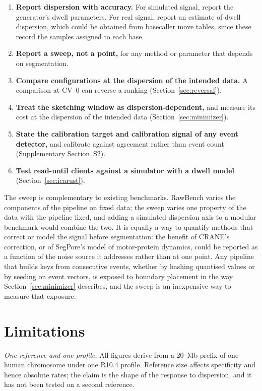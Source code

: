 \documentclass[11pt,a4paper]{article}
\begin{document}
\begin{enumerate}
  \item \textbf{Report dispersion with accuracy.} For simulated signal, report the generator's
    dwell parameters. For real signal, report an estimate of dwell dispersion, which could be
    obtained from basecaller move tables, since these record the samples assigned to each base.
  \item \textbf{Report a sweep, not a point,} for any method or parameter that depends on
    segmentation.
  \item \textbf{Compare configurations at the dispersion of the intended data.} A comparison at
    CV~0 can reverse a ranking (Section~\ref{sec:reversal}).
  \item \textbf{Treat the sketching window as dispersion-dependent,} and measure its cost at the
    dispersion of the intended data (Section~\ref{sec:minimizer}).
  \item \textbf{State the calibration target and calibration signal of any event detector,} and
    calibrate against agreement rather than event count (Supplementary Section~S2).
  \item \textbf{Test read-until clients against a simulator with a dwell model}
    (Section~\ref{sec:icarust}).
\end{enumerate}

The sweep is complementary to existing benchmarks. RawBench varies the components of the pipeline
on fixed data; the sweep varies one property of the data with the pipeline fixed, and adding a
simulated-dispersion axis to a modular benchmark would combine the two. It is equally a way to
quantify methods that correct or model the signal before segmentation: the benefit of CRANE's
correction, or of SegPore's model of motor-protein dynamics, could be reported as a function of the
noise source it addresses rather than at one point.
Any pipeline that builds keys from consecutive events, whether by hashing quantised values or by
seeding on event vectors, is exposed to boundary placement in the way Section~\ref{sec:minimizer}
describes, and the sweep is an inexpensive way to measure that exposure.

\section{Limitations}\label{sec:limitations}

\textit{One reference and one profile.} All figures derive from a 20~Mb prefix of one human
chromosome under one R10.4 profile. Reference size affects specificity and hence absolute rates;
the claim is the shape of the response to dispersion, and it has not been tested on a second
reference.
\end{document}
